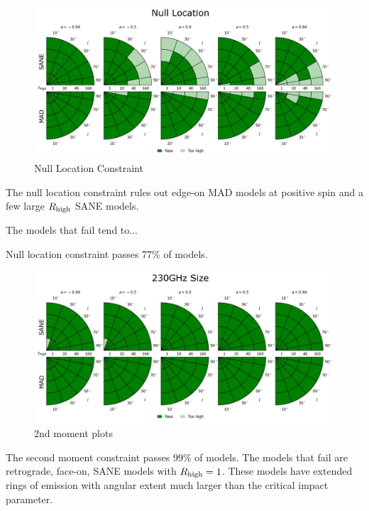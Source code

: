 \begin{figure}
  \centering
  \includegraphics[width=\columnwidth]{./figures/Null_loc_Constraints.png}
  \caption{Null Location Constraint}
  \label{fig:cmp_ozel}
\end{figure}

The null location constraint rules out edge-on MAD models at positive spin and a few large $R_\mathrm{high}$ SANE models.

The models that fail tend to...

Null location constraint passes 77\% of models.


\begin{figure}
  \centering
  \includegraphics[width=\columnwidth]{./figures/230GHz_size_Constraints.png}
  \caption{2nd moment plots}
  \label{fig:cmp_2nd_moment}
\end{figure}

The second moment constraint passes 99\% of models.  The models that fail are retrograde, face-on, SANE models with $R_\mathrm{high} = 1$. These models have extended rings of emission with angular extent much larger than the critical impact parameter.

